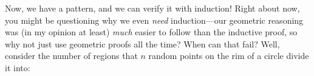 \documentclass[10pt]{article}
\theoremstyle{definition}
\begin{document}
Now, we have a pattern, and we can verify it with induction!  Right about now, you might be questioning why we even \emph{need} induction---our geometric reasoning was (in my opinion at least) \emph{much} easier to follow than the inductive proof, so why not just use geometric proofs all the time?  When can that fail?  Well, consider the number of regions that $n$ random points on the rim of a circle divide it into:
\begin{figure}[H]
    \centering
    \begin{minipage}{.3\textwidth}
    \end{minipage}
        \begin{minipage}{.3\textwidth}
        \end{minipage}
    \begin{minipage}{.3\textwidth}
    \end{minipage}
\end{figure}
%
%
%
%
\end{document}
